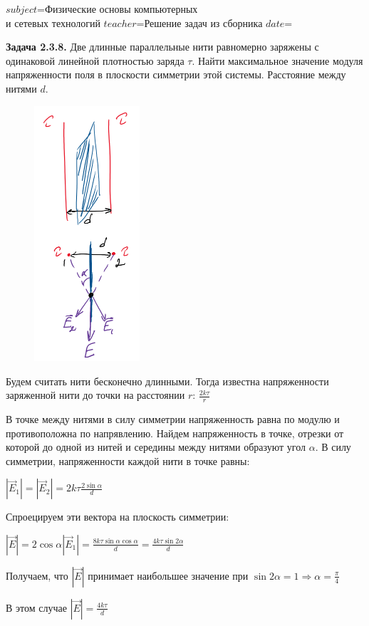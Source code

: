 $subject$=Физические основы компьютерных \\ и сетевых технологий
$teacher$=Решение задач из сборника
$date$=

\clearpage

\begin{tcolorbox}
    \textbf{Задача 2.3.8.} Две длинные параллельные нити равномерно
    заряжены с одинаковой линейной плотностью заряда $\tau$. Найти
    максимальное значение модуля напряженности поля в плоскости
    симметрии этой системы. Расстояние между нитями $d$.
\end{tcolorbox}

\begin{minipage}{\textwidth}
    \begin{figure}
        \includegraphics[width=0.35\textwidth]{physics1/images/physics1_homework_7_1}
    \end{figure}

    Будем считать нити бесконечно длинными. Тогда известна напряженности заряженной нити до точки на расстоянии $r$: $\frac{2k\tau}{r}$

    В точке между нитями в силу симметрии напряженность равна по модулю и противоположна по напрявлению. Найдем напряженность в точке,
    отрезки от которой до одной из нитей и середины между нитями образуют угол $\alpha$. В силу симметрии, напряженности
    каждой нити в точке равны:

    $|\vec{E}_1| = |\vec{E}_2| = 2k\tau \frac{2\sin\alpha}{d}$

    Спроецируем эти вектора на плоскость симметрии:

    $|\vec{E}| = 2\cos\alpha |\vec{E}_1| = \frac{8k\tau \sin\alpha\cos\alpha}{d} = \frac{4k\tau \sin2\alpha}{d}$

    Получаем, что $|\vec{E}|$ принимает наибольшее значение при $\sin2\alpha = 1 \Longrightarrow \alpha = \frac{\pi}{4}$

    В этом случае $|\vec{E}| = \frac{4k\tau}{d}$
\end{minipage}

